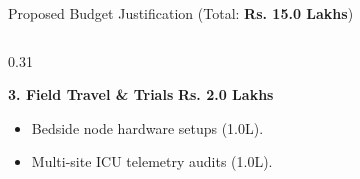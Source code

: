 \documentclass[aspectratio=169, 11pt]{beamer}
\begin{document}
\begin{frame}{Proposed Budget Justification (Total: \textbf{Rs. 15.0 Lakhs})}
\begin{columns}[t]
        \begin{column}{0.31\textwidth}
            \begin{block}{\textcolor{neonAmber}{\textbf{3. Field Travel \& Trials}}}
                \centering
                \vspace{0.1cm}
                {\normalsize\textbf{\textcolor{neonAmber}{Rs. 2.0 Lakhs}}} \\
                \vspace{0.2cm}
                \flushleft\tiny
                \begin{itemize}
                    \item Bedside node hardware setups (1.0L).
                    \item Multi-site ICU telemetry audits (1.0L).
                \end{itemize}
            \end{block}
        \end{column}
    \end{columns}
\end{frame}
\end{document}

